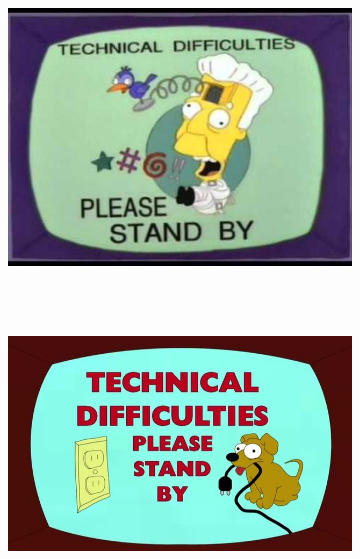 \documentclass[
  letterpaper,
  DIV=11,
  numbers=noendperiod]{scrreprt}
\begin{document}
\begin{figure}
\begin{minipage}{0.50\linewidth}
\begin{figure}[H]
{}


\end{figure}%

\end{minipage}%
\newline
\begin{minipage}{0.50\linewidth}

\begin{figure}[H]

{\centering \includegraphics[width=\textwidth,height=3in]{quarto_docs/../img/technical_difficulties_3.png}

}


\end{figure}%

\end{minipage}%
%
\begin{minipage}{0.50\linewidth}

\begin{figure}[H]

{\centering \includegraphics[width=\textwidth,height=3in]{quarto_docs/../img/technical_difficulties_4.png}

}


\end{figure}%

\end{minipage}%

\end{figure}%
\end{document}
